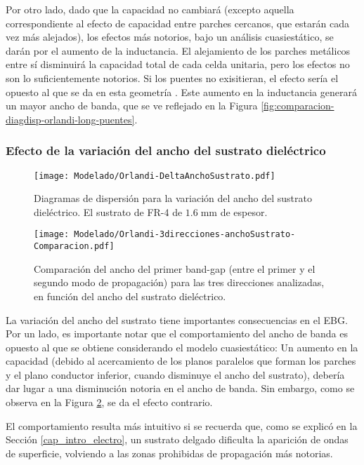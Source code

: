 Por otro lado, dado que la capacidad no cambiará (excepto aquella correspondiente al efecto de capacidad entre parches cercanos, que estarán cada vez más alejados), los efectos más notorios, bajo un análisis cuasiestático, se darán por el aumento de la inductancia. El alejamiento de los parches metálicos entre sí disminuirá la capacidad total de cada celda unitaria, pero los efectos no son lo suficientemente notorios. Si los puentes no exisitieran, el efecto sería el opuesto al que se da en esta geometría \cite{Yang:EBGAntennas}. Este aumento en la inductancia generará un mayor ancho de banda, que se ve reflejado en la Figura \ref{fig:comparacion-diagdisp-orlandi-long-puentes}.

\subsubsection{Efecto de la variación del ancho del sustrato dieléctrico}

\begin{figure}[h]
	\centering
	\texttt{[image: Modelado/Orlandi-DeltaAnchoSustrato.pdf]}
	\caption{Diagramas de dispersión para la variación del ancho del sustrato dieléctrico. El sustrato de FR-4 de $1.6\;\text{mm}$ de espesor.}
	\label{fig:diagdisp-orlandi-variacion-ancho-diel}
\end{figure}


\begin{figure}[h]
	\centering
	\texttt{[image: Modelado/Orlandi-3direcciones-anchoSustrato-Comparacion.pdf]}
	\caption{Comparación del ancho del primer band-gap (entre el primer y el segundo modo de propagación) para las tres direcciones analizadas, en función del ancho del sustrato dieléctrico.}
	\label{fig:comparacion-diagdisp-orlandi-variacion-ancho-diel}
\end{figure}

La variación del ancho del sustrato tiene importantes consecuencias en el EBG. Por un lado, es importante notar que el comportamiento del ancho de banda es opuesto al que se obtiene considerando el modelo cuasiestático: Un aumento en la capacidad (debido al acercamiento de los planos paralelos que forman los parches y el plano conductor inferior, cuando disminuye el ancho del sustrato), debería dar lugar a una disminución notoria en el ancho de banda. Sin embargo, como se observa en la Figura \ref{fig:comparacion-diagdisp-orlandi-variacion-ancho-diel}, se da el efecto contrario.

El comportamiento resulta más intuitivo si se recuerda que, como se explicó en la Sección \ref{cap_intro_electro}, un sustrato delgado dificulta la aparición de ondas de superficie, volviendo a las zonas prohibidas de propagación más notorias.

